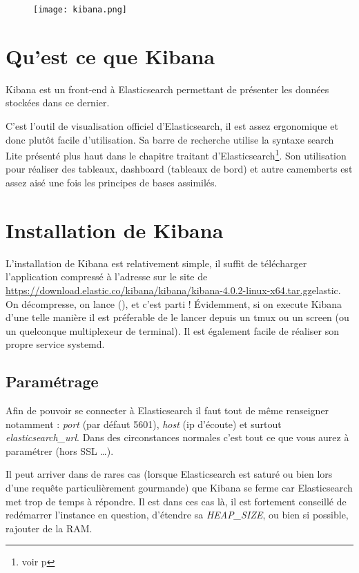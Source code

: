 \begin{figure}[H]
\center
\texttt{[image: kibana.png]}
\label{fig:kibana.png}
\end{figure}
\section{Qu'est ce que Kibana}
Kibana est un front-end à Elasticsearch permettant de présenter les données stockées dans ce dernier. 

C'est l'outil de visualisation officiel d'Elasticsearch, il est assez ergonomique 
et donc plutôt facile d'utilisation. Sa barre de recherche utilise la syntaxe 
search Lite présenté plus haut dans le chapitre traitant d'Elasticsearch\footnote{voir p\pageref{subsec:elasticsearchlite}}.
Son utilisation pour réaliser des tableaux, dashboard (tableaux de bord) et autre 
camemberts est assez aisé une fois les principes de bases assimilés.



\section{Installation de Kibana}
L'installation de Kibana est relativement simple, il suffit de télécharger l'application
compressé à l'adresse sur le site de \url{https://download.elastic.co/kibana/kibana/kibana-4.0.2-linux-x64.tar.gz}{elastic}.
On décompresse, on lance (), et c'est parti !
Évidemment, si on execute Kibana d'une telle manière il est préferable de le lancer
depuis un tmux ou un screen (ou un quelconque multiplexeur de terminal). Il est 
également facile de réaliser son propre service systemd.

\subsection{Paramétrage}
Afin de pouvoir se connecter à Elasticsearch il faut tout de même renseigner 
 notamment : \emph{port} (par défaut 5601), \emph{host} (ip d'écoute)
et surtout \emph{elasticsearch\_url}.
Dans des circonstances normales c'est tout ce que vous aurez à paramétrer (hors 
SSL \ldots{}).

Il peut arriver dans de rares cas (lorsque Elasticsearch est saturé ou bien lors 
d'une requête particulièrement gourmande) que Kibana se ferme car Elasticsearch met
trop de temps à répondre. Il est dans ces cas là, il est fortement conseillé de 
redémarrer l'instance en question, d'étendre sa \emph{HEAP\_SIZE}, ou bien si possible, 
rajouter de la RAM.

